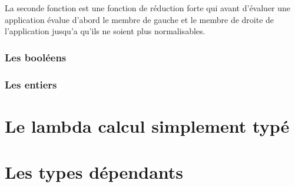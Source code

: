 \documentclass {article}
\theoremstyle{definition}
\theoremstyle{remark}
\begin{document}
La seconde fonction est une fonction de réduction forte qui avant d'évaluer une
application évalue d'abord le membre de gauche et le membre de droite de 
l'application jusqu'a qu'ils ne soient plus normalisables. 
 


\subsubsection{Les booléens}
\subsubsection{Les entiers}

\section{Le lambda calcul simplement typé}

\section{Les types dépendants}


\end{document}
